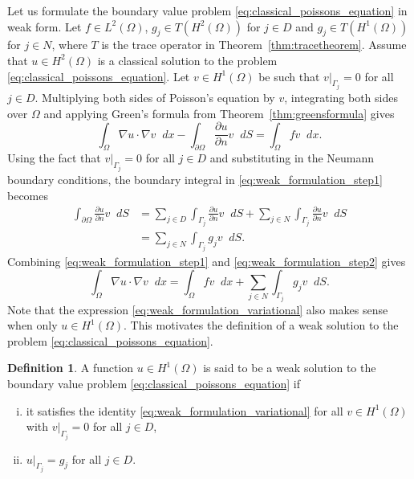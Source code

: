 \documentclass[english, 12pt, a4paper, sci, utf8, a-2b, online]{aaltothesis}
\theoremstyle{definition}
\newtheorem{definition}{Definition}[section]
\theoremstyle{plain}
\newcommand*\diff{\mathop{}\!d}
\numberwithin{equation}{section}
\begin{document}
Let us formulate the boundary value problem \eqref{eq:classical_poissons_equation}
in weak form.
Let $f \in L^2(\Omega)$, $g_j \in T(H^2(\Omega))$ for $j \in D$ and
$g_j \in T(H^1(\Omega))$ for $j \in N$, where $T$ is the trace operator in
Theorem~\ref{thm:tracetheorem}. Assume that $u \in H^2(\Omega)$
is a classical solution to the problem \eqref{eq:classical_poissons_equation}.
Let $v \in H^1(\Omega)$ be such that $v|_{\Gamma_j} = 0$ for all $j \in D$.
Multiplying both sides of Poisson's equation by $v$,
integrating both sides over $\Omega$ and applying Green's formula
from Theorem~\ref{thm:greensformula} gives
\begin{equation}
    \label{eq:weak_formulation_step1}
    \int_{\Omega} \nabla u \cdot \nabla v \diff x
        - \int_{\partial \Omega} \frac{\partial u}{\partial n} v \diff S
    = \int_{\Omega} f v \diff x.
\end{equation}
Using the fact that $v|_{\Gamma_j} = 0$ for all $j \in D$
and substituting in the Neumann boundary conditions,
the boundary integral in \eqref{eq:weak_formulation_step1} becomes
\begin{align}
    \int_{\partial \Omega} \frac{\partial u}{\partial n} v \diff S
    &= \sum_{j \in D} \int_{\Gamma_j} \frac{\partial u}{\partial n} v \diff S
        + \sum_{j \in N} \int_{\Gamma_j} \frac{\partial u}{\partial n} v \diff S
            \nonumber \\
    \label{eq:weak_formulation_step2}
    &= \sum_{j \in N} \int_{\Gamma_j} g_j v \diff S.
\end{align}
Combining \eqref{eq:weak_formulation_step1} and \eqref{eq:weak_formulation_step2}
gives
\begin{equation}
    \label{eq:weak_formulation_variational}
    \int_{\Omega} \nabla u \cdot \nabla v \diff x
    = \int_{\Omega} f v \diff x + \sum_{j \in N} \int_{\Gamma_j} g_j v \diff S.
\end{equation}
Note that the expression \eqref{eq:weak_formulation_variational}
also makes sense when only
$u \in H^1(\Omega)$. This motivates the definition of a weak solution
to the problem \eqref{eq:classical_poissons_equation}.
\begin{definition}
    \label{def:weak_solution}
    A function $u \in H^1(\Omega)$ is said to be a weak solution to the
    boundary value problem \eqref{eq:classical_poissons_equation} if
    \begin{enumerate}[(i)]
        \item it satisfies the identity \eqref{eq:weak_formulation_variational}
        for all $v \in H^1(\Omega)$ with $v|_{\Gamma_j} = 0$ for all $j \in D$,
        \item $u|_{\Gamma_j} = g_j$ for all $j \in D$.
    \end{enumerate}
\end{definition}
\end{document}
